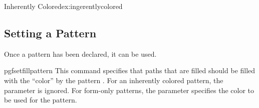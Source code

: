 \begin{texexample}{Inherently Colored}{ex:ingerentlycolored}
{\pgfpointorigin}{\pgfpoint{1cm}{1cm}}
{\pgfpoint{1cm}{1cm}}
{
  \pgftransformshift{\pgfpoint{.5cm}{.5cm}}
  \pgfpathclose%
}
\end{texexample}



\subsection{Setting a Pattern}

Once a pattern has been declared, it can be used.

\begin{docCommand}{pgfsetfillpattern}{}
  This command specifies that paths that are filled should be filled
  with the ``color'' by the pattern . For an inherently
  colored pattern, the  parameter is ignored. For
  form-only patterns, the  parameter specifies the color
  to be used for the pattern.
\end{docCommand}
  
\begin{codeexample}[]
\end{codeexample}



\endinput
%


